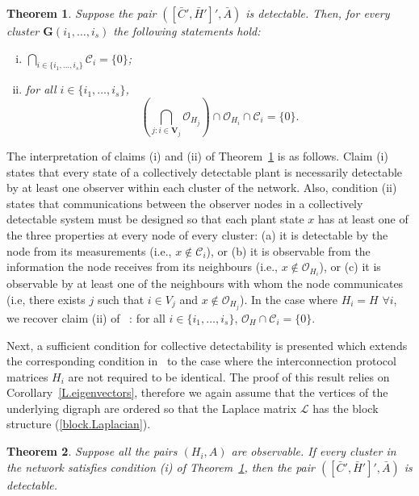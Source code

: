 \documentclass[a4paper,10pt,conference]{ieeeconf}
\newtheorem{theorem}{Theorem}
\begin{document}
\begin{theorem}\label{detect.theorem}
Suppose the pair $([\bar C',\bar H']',\bar A)$ is detectable. Then, for
every cluster $\mathbf{G}(i_1,\ldots,i_s)$ 
the following statements hold:
\begin{enumerate}[(i)]
\item
$\bigcap_{i\in\{i_1,\ldots,i_s\}} \mathcal{C}_i=\{0\}$;
\item for all $i\in\{i_1,\ldots,i_s\}$,
\[
\left(\bigcap_{j: i\in \mathbf{V}_j}\mathcal{O}_{H_j}\right)\cap
\mathcal{O}_{H_i} \cap \mathcal{C}_i=\{0\}.
\]
\end{enumerate}
\end{theorem}



The interpretation of claims (i) and (ii) of Theorem~\ref{detect.theorem} 
is as follows. Claim (i) states that every state of a collectively
detectable plant is necessarily detectable by at least one observer
within each cluster of the network. 
Also, condition (ii) states that communications between the observer
nodes in a collectively detectable system must be designed so that 
each plant state $x$ has at least one of the three properties at every node
of every cluster: (a) it is detectable by the node from its measurements (i.e.,
$x\not\in\mathcal{C}_i$), or (b) it is observable from the information the node
receives from its neighbours (i.e., $x\not\in\mathcal{O}_{H_i}$), or (c) 
it is observable by at least one of the neighbours with whom the node
communicates (i.e, there exists $j$ such that $i\in V_j$ and
$x\not\in\mathcal{O}_{H_j}$). In the case where $H_i=H$ $\forall i$, we
recover claim (ii) of ~\cite[Theorem 3]{U7b-journal}: for all
$i\in\{i_1,\ldots,i_s\}$, 
$\mathcal{O}_H \cap \mathcal{C}_i=\{0\}$. 

   

Next, a sufficient condition for collective detectability is presented which
extends the corresponding condition in~\cite[Theorem~4]{U7b-journal} to the
case where the interconnection protocol matrices $H_i$ are not required to be
identical. The proof of this result relies on
Corollary~\ref{L.eigenvectors}, therefore we again assume 
that the vertices of the underlying digraph are ordered so that the Laplace
matrix $\mathcal{L}$ has the block structure (\ref{block.Laplacian}).

\begin{theorem}\label{detect.theorem.sufficient}
Suppose all the pairs $(H_i,A)$ are observable. If every cluster in the
network satisfies condition (i) of Theorem~\ref{detect.theorem}, then the
pair $([\bar C',\bar H']',\bar A)$ is detectable.  
\end{theorem}
\end{document}
